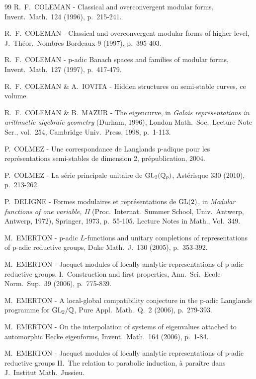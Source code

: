 \begin{thebibliography}{99}
 R.~F.~COLEMAN - Classical and overconvergent modular forms, Invent.\ Math.\ 124 (1996), p.~215-241.

 R.~F.~COLEMAN - Classical and overconvergent modular forms of higher level, J.\ Th\'eor.\ Nombres Bordeaux 9 (1997), p.~395-403.

 R.~F.~COLEMAN - p-adic Banach spaces and families of modular forms, Invent.\ Math.\ 127 (1997), p.~417-479.

 R.~F.~COLEMAN \& A.~IOVITA - Hidden structures on semi-stable curves, ce volume.

 R.~F.~COLEMAN \& B.~MAZUR - The eigencurve, in \emph{Galois representations in arithmetic algebraic geometry} (Durham, 1996), London Math.\ Soc.\ Lecture Note Ser., vol.~254, Cambridge Univ.\ Press, 1998, p.~1-113.

 P.~COLMEZ - Une correspondance de Langlands p-adique pour les repr\'esentations semi-stables de dimension 2, pr\'epublication, 2004.

 P.~COLMEZ - La s\'erie principale unitaire de $\mathrm{GL}_2(\mathbb{Q}_p)$, Ast\'erisque 330 (2010), p.~213-262.

 P.~DELIGNE - Formes modulaires et repr\'esentations de $\mathrm{GL}(2)$, in \emph{Modular functions of one variable, II} (Proc.\ Internat.\ Summer School, Univ.\ Antwerp, Antwerp, 1972), Springer, 1973, p.~55-105. Lecture Notes in Math., Vol.~349.

 M.~EMERTON - p-adic $L$-functions and unitary completions of representations of p-adic reductive groups, Duke Math.\ J.\ 130 (2005), p.~353-392.

 M.~EMERTON - Jacquet modules of locally analytic representations of p-adic reductive groups. I.\ Construction and first properties, Ann.\ Sci.\ Ecole Norm.\ Sup.\ 39 (2006), p.~775-839.

 M.~EMERTON - A local-global compatibility conjecture in the p-adic Langlands programme for $\mathrm{GL}_2/\mathbb{Q}$, Pure Appl.\ Math.\ Q.\ 2 (2006), p.~279-393.

 M.~EMERTON - On the interpolation of systems of eigenvalues attached to automorphic Hecke eigenforms, Invent.\ Math.\ 164 (2006), p.~1-84.

 M.~EMERTON - Jacquet modules of locally analytic representations of p-adic reductive groups II.\ The relation to parabolic induction, \`a para\^itre dans J.\ Institut Math.\ Jussieu.


\end{thebibliography}
